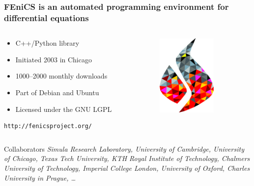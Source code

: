 \begin{frame}
  \frametitle{FEniCS is an automated programming environment for differential equations}
  \normalsize

  \begin{columns}

    \begin{column}{0.6\textwidth}

      \begin{itemize}
      \item
        C++/Python library
      \item
        Initiated 2003 in Chicago
      \item
        1000--2000 monthly downloads
      \item
        Part of Debian and Ubuntu
      \item
        Licensed under the GNU LGPL
      \end{itemize}

      \vspace{0.5cm}

      \large
      \texttt{http://fenicsproject.org/}

    \end{column}

    \begin{column}{0.4\textwidth}
      \includegraphics[height=4cm]{png/fenics_logo.png}
    \end{column}

  \end{columns}

  \vspace{0.5cm}

  \begin{block}{Collaborators}
    \it
    Simula Research Laboratory,
    University of Cambridge,
    University of Chicago,
    Texas Tech University,
    KTH Royal Institute of Technology,
    Chalmers University of Technology,
    Imperial College London,
    University of Oxford,
    Charles University in Prague,
    \ldots
  \end{block}

\end{frame}
